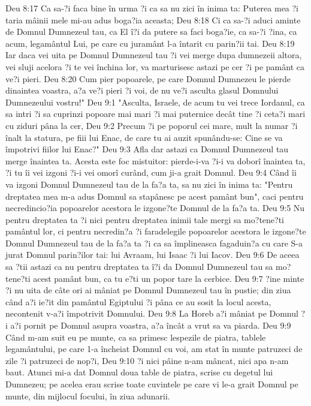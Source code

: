 Deu 8:17  Ca sa-?i faca bine în urma ?i ca sa nu zici în inima ta: Puterea mea ?i taria mâinii mele mi-au adus boga?ia aceasta;
Deu 8:18  Ci ca sa-?i aduci aminte de Domnul Dumnezeul tau, ca El î?i da putere sa faci boga?ie, ca sa-?i ?ina, ca acum, legamântul Lui, pe care cu juramânt l-a întarit cu parin?ii tai.
Deu 8:19  Iar daca vei uita pe Domnul Dumnezeul tau ?i vei merge dupa dumnezeii altora, vei sluji acelora ?i te vei închina lor, va marturisesc astazi pe cer ?i pe pamânt ca ve?i pieri.
Deu 8:20  Cum pier popoarele, pe care Domnul Dumnezeu le pierde dinaintea voastra, a?a ve?i pieri ?i voi, de nu ve?i asculta glasul Domnului Dumnezeului vostru!"
Deu 9:1  "Asculta, Israele, de acum tu vei trece Iordanul, ca sa intri ?i sa cuprinzi popoare mai mari ?i mai puternice decât tine ?i ceta?i mari cu ziduri pâna la cer,
Deu 9:2  Precum ?i pe poporul cei mare, mult la numar ?i înalt la statura, pe fiii lui Enac, de care tu ai auzit spunându-se: Cine se va împotrivi fiilor lui Enac?"
Deu 9:3  Afla dar astazi ca Domnul Dumnezeul tau merge înaintea ta. Acesta este foc mistuitor: pierde-i-va ?i-i va doborî înaintea ta, ?i tu îi vei izgoni ?i-i vei omorî curând, cum ji-a grait Domnul.
Deu 9:4  Când îi va izgoni Domnul Dumnezeul tau de la fa?a ta, sa nu zici în inima ta: "Pentru dreptatea mea m-a adus Domnul sa stapânesc pe acest pamânt bun", caci pentru necredincio?ia popoarelor acestora le izgone?te Domnul de la fa?a ta.
Deu 9:5  Nu pentru dreptatea ta ?i nici pentru dreptatea inimii tale mergi sa mo?tene?ti pamântul lor, ci pentru necredin?a ?i faradelegile popoarelor acestora le izgone?te Domnul Dumnezeul tau de la fa?a ta ?i ca sa împlineasca fagaduin?a cu care S-a jurat Domnul parin?ilor tai: lui Avraam, lui Isaac ?i lui Iacov.
Deu 9:6  De aceea sa ?tii astazi ca nu pentru dreptatea ta î?i da Domnul Dumnezeul tau sa mo?tene?ti acest pamânt bun, ca tu e?ti un popor tare la cerbice.
Deu 9:7  ?ine minte ?i nu uita de câte ori ai mâniat pe Domnul Dumnezeul tau în pustie; din ziua când a?i ie?it din pamântul Egiptului ?i pâna ce au sosit la locul acesta, necontenit v-a?i împotrivit Domnului.
Deu 9:8  La Horeb a?i mâniat pe Domnul ?i a?i pornit pe Domnul asupra voastra, a?a încât a vrut sa va piarda.
Deu 9:9  Când m-am suit eu pe munte, ca sa primesc lespezile de piatra, tablele legamântului, pe care 1-a încheiat Domnul cu voi, am stat în munte patruzeci de zile ?i patruzeci de nop?i,
Deu 9:10  ?i nici pâine n-am mâncat, nici apa n-am baut. Atunci mi-a dat Domnul doua table de piatra, scrise cu degetul lui Dumnezeu; pe acelea erau scrise toate cuvintele pe care vi le-a grait Domnul pe munte, din mijlocul focului, în ziua adunarii.
